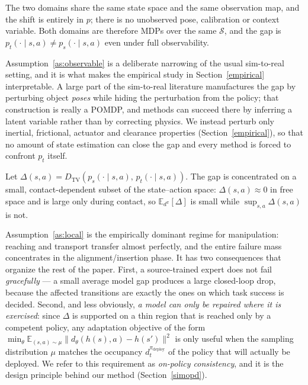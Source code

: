 \begin{assumption}
\label{as:observable}
The two domains share the same state space and the same observation map, and
the shift is entirely in $p$; there is no unobserved pose, calibration or
context variable. Both domains are therefore MDPs over the same
$\mathcal{S}$, and the gap is $p_t(\cdot \mid s,a) \neq p_s(\cdot \mid s,a)$
even under full observability.
\end{assumption}

Assumption~\ref{as:observable} is a deliberate narrowing of the usual
sim-to-real setting, and it is what makes the empirical study in
Section~\ref{empirical} interpretable. A large part of the sim-to-real
literature manufactures the gap by perturbing object \emph{poses} while hiding
the perturbation from the policy; that construction is really a POMDP, and
methods can succeed there by inferring a latent variable rather than by
correcting physics. We instead perturb only inertial, frictional, actuator and
clearance properties (Section~\ref{empirical}), so that no amount of state
estimation can close the gap and every method is forced to confront
$p_t$ itself.

\begin{assumption}
\label{as:local}
Let $\Delta(s,a) = D_{\mathrm{TV}}\!\left(p_s(\cdot \mid s,a),\,
p_t(\cdot \mid s,a)\right)$. The gap is concentrated on a small,
contact-dependent subset of the state--action space: $\Delta(s,a) \approx 0$
in free space and is large only during contact, so
$\mathbb{E}_{d^{\pi}}[\Delta]$ is small while $\sup_{s,a} \Delta(s,a)$ is not.
\end{assumption}

Assumption~\ref{as:local} is the empirically dominant regime for manipulation:
reaching and transport transfer almost perfectly, and the entire failure mass
concentrates in the alignment/insertion phase. It has two consequences that
organize the rest of the paper. First, a source-trained expert does not fail
\emph{gracefully} --- a small average model gap produces a large closed-loop
drop, because the affected transitions are exactly the ones on which task
success is decided. Second, and less obviously, \emph{a model can only be
repaired where it is exercised}: since $\Delta$ is supported on a thin region
that is reached only by a competent policy, any adaptation objective of the
form $\min_\theta \mathbb{E}_{(s,a) \sim \mu}\|d_\theta(h(s),a) - h(s')\|^2$
is only useful when the sampling distribution $\mu$ matches the occupancy
$d^{\pi_{\text{deploy}}}_{t}$ of the policy that will actually be
deployed. We refer to this requirement as \emph{on-policy consistency}, and it
is the design principle behind our method (Section~\ref{simopd}).

